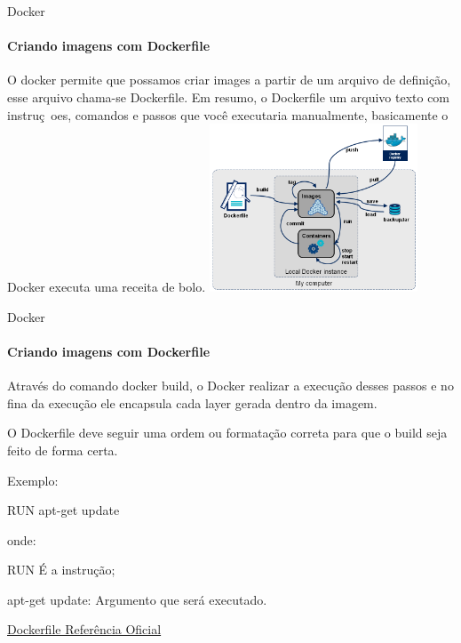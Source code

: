 \documentclass{beamer}
\begin{document}
\begin{frame}{Docker}
    \framesubtitle{Criando imagens com Dockerfile}
    O docker permite que possamos criar images a partir de um arquivo de defini\c{c}\~ao, 
    esse arquivo chama-se Dockerfile. Em resumo, o Dockerfile  um arquivo texto com
    instru\c{c}~oes, comandos e passos que voc\^e executaria manualmente, basicamente
    o Docker executa uma receita de bolo.
    \includegraphics[height=5cm]{img/docker-stages.png}
\end{frame}

\begin{frame}{Docker}
    \framesubtitle{Criando imagens com Dockerfile}
    Atrav\'es do comando docker build, o Docker realizar a execu\c{c}\~ao desses passos 
    e no fina da execu\c{c}\~ao ele encapsula cada layer gerada dentro da imagem.

    O Dockerfile deve seguir uma ordem ou formata\c{c}\~ao correta para que o build
    seja feito de forma certa.

    Exemplo:

    RUN apt-get update

    onde:

    RUN  \'E a instru\c{c}\~ao;

    apt-get update: Argumento que ser\'a executado.

    \href{https://docs.docker.com/engine/reference/builder/}{Dockerfile Referência Oficial}
\end{frame}
\end{document}
